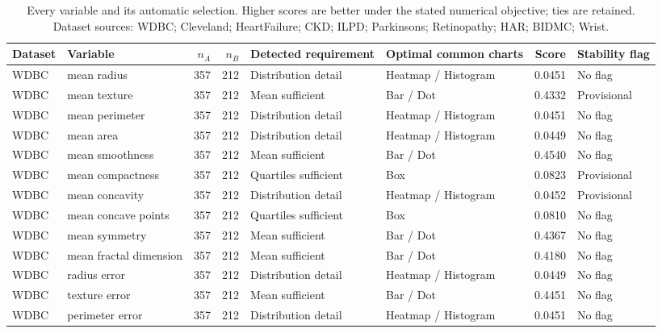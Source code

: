 \small\setlength{\tabcolsep}{4pt}\setlength{\LTcapwidth}{\linewidth}
\begin{longtable}{>{\raggedright\arraybackslash}p{2.5cm}>{\raggedright\arraybackslash}p{4.5cm}rr>{\raggedright\arraybackslash}p{3.0cm}>{\raggedright\arraybackslash}p{4.0cm}rp{2.0cm}}
\caption{Every variable and its automatic selection. Higher scores are better under the stated numerical objective; ties are retained. Dataset sources: WDBC\cite{wdbc}; Cleveland\cite{heart}; HeartFailure\cite{failure}; CKD\cite{kidney}; ILPD\cite{liver}; Parkinsons\cite{parkinsons}; Retinopathy\cite{retina}; HAR\cite{har}; BIDMC\cite{bidmc}; Wrist\cite{wrist}.}\\
\toprule Dataset & Variable & $n_A$ & $n_B$ & Detected requirement & Optimal common charts & Score & Stability flag\\\midrule\endhead
WDBC\cite{wdbc} & mean radius & 357 & 212 & Distribution detail & Heatmap / Histogram & 0.0451 & No flag\\
WDBC\cite{wdbc} & mean texture & 357 & 212 & Mean sufficient & Bar / Dot & 0.4332 & Provisional\\
WDBC\cite{wdbc} & mean perimeter & 357 & 212 & Distribution detail & Heatmap / Histogram & 0.0451 & No flag\\
WDBC\cite{wdbc} & mean area & 357 & 212 & Distribution detail & Heatmap / Histogram & 0.0449 & No flag\\
WDBC\cite{wdbc} & mean smoothness & 357 & 212 & Mean sufficient & Bar / Dot & 0.4540 & No flag\\
WDBC\cite{wdbc} & mean compactness & 357 & 212 & Quartiles sufficient & Box & 0.0823 & Provisional\\
WDBC\cite{wdbc} & mean concavity & 357 & 212 & Distribution detail & Heatmap / Histogram & 0.0452 & Provisional\\
WDBC\cite{wdbc} & mean concave points & 357 & 212 & Quartiles sufficient & Box & 0.0810 & No flag\\
WDBC\cite{wdbc} & mean symmetry & 357 & 212 & Mean sufficient & Bar / Dot & 0.4367 & No flag\\
WDBC\cite{wdbc} & mean fractal dimension & 357 & 212 & Mean sufficient & Bar / Dot & 0.4180 & No flag\\
WDBC\cite{wdbc} & radius error & 357 & 212 & Distribution detail & Heatmap / Histogram & 0.0449 & No flag\\
WDBC\cite{wdbc} & texture error & 357 & 212 & Mean sufficient & Bar / Dot & 0.4451 & No flag\\
WDBC\cite{wdbc} & perimeter error & 357 & 212 & Distribution detail & Heatmap / Histogram & 0.0451 & No flag\\

\end{longtable}
